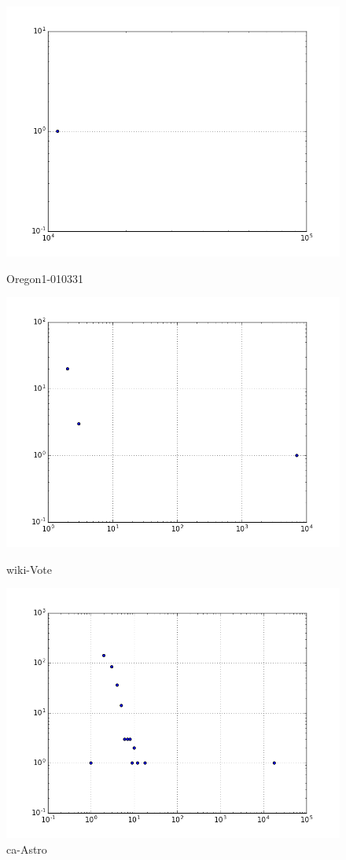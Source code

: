 \begin{figure}[H]
  \includegraphics[width=\linewidth]{img/oregon-010331/comp_dist.png}
  \caption*{Oregon1-010331}
\endminipage\hfill
{}
  \includegraphics[width=\linewidth]{img/wiki-Vote/comp_dist.png}
  \caption*{wiki-Vote}
\endminipage\hfill
{}
  \includegraphics[width=\linewidth]{img/ca-Astro/comp_dist.png}
  \caption*{ca-Astro}
\endminipage
\end{figure}
